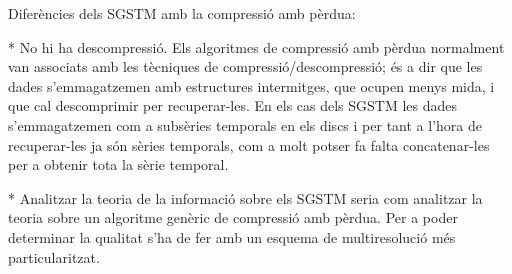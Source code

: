 Diferències dels SGSTM amb la compressió amb pèrdua: 

* No hi ha descompressió. Els algoritmes de compressió amb pèrdua normalment van associats amb les tècniques de compressió/descompressió; és a dir que les dades s'emmagatzemen amb estructures intermitges, que ocupen menys mida, i que cal descomprimir per recuperar-les. En els cas dels SGSTM les dades s'emmagatzemen com a subsèries temporals en els discs i per tant a l'hora de recuperar-les ja són sèries temporals, com a molt potser fa falta concatenar-les per a obtenir tota la sèrie temporal.


* Analitzar la teoria de la informació sobre els SGSTM seria com analitzar la teoria sobre un algoritme genèric de compressió amb pèrdua. Per a poder determinar la qualitat s'ha de fer amb un esquema de multiresolució més particularitzat.







